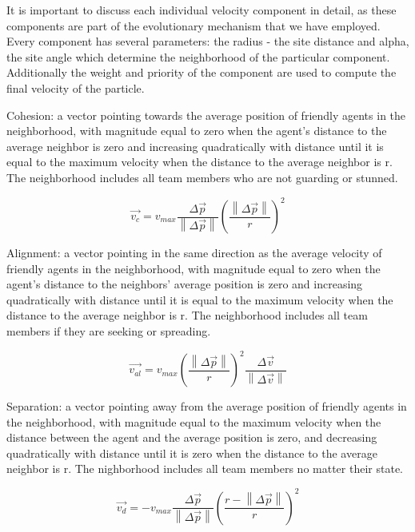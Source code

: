 \documentclass[12pt,journal,compsoc]{IEEEtran}
\begin{document}
It is important to discuss each individual velocity component in detail, as these components are part of the evolutionary mechanism that we have employed. Every component has several parameters: the radius - the site distance and alpha, the site angle which determine the neighborhood of the particular component. Additionally the weight and priority of the component are used to compute the final velocity of the particle.

Cohesion: a vector pointing towards the average position of friendly agents in the neighborhood, with magnitude equal to zero when the agent's distance to the average neighbor is zero and increasing quadratically with distance until it is equal to the maximum velocity when the distance to the average neighbor is r. The neighborhood includes all team members who are not guarding or stunned.

\begin{equation}
    \vec { v_{ c } } =v_{ max }\frac { \Delta  \vec { p }  }{ \left\|   \Delta \vec { p }  \right\|  } \left( \frac { \left\|  \Delta \vec {  p }  \right\|  }{ r }  \right) ^{ 2 }
    \label{eqn:cohesion}
\end{equation}

Alignment: a vector pointing in the same direction as the average velocity of friendly agents in the neighborhood, with magnitude equal to zero when the agent's distance to the neighbors' average position is zero and increasing quadratically with distance until it is equal to the maximum velocity when the distance to the average neighbor is r. The neighborhood includes all team members if they are seeking or spreading.

\begin{equation}
    \vec { v_{ al } } =v_{ max }{\left( \frac { \left\| \Delta \vec { p } \right\|  }{ r }  \right)}^2\frac {\Delta \vec{v}} { \left\| \Delta \vec{v} \right\| }
    \label{eqn:alignment}
\end{equation}

Separation: a vector pointing away from the average position of friendly agents in the neighborhood, with magnitude equal to the maximum velocity when the distance between the agent and the average position is zero, and decreasing quadratically with distance until it is zero when the distance to the average neighbor is r. The nighborhood includes all team members no matter their state.

\begin{equation}
    \vec { v_{ d } } =-v_{ max }\frac {\Delta \vec{p}} { \left\| \Delta \vec{p} \right\| }{\left( \frac { r - \left\| \Delta \vec { p } \right\|  }{ r }  \right)}^2
    \label{eqn:separation}
\end{equation}
\end{document}

